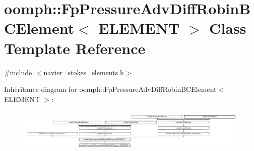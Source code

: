 \hypertarget{classoomph_1_1FpPressureAdvDiffRobinBCElement}{}\section{oomph\+:\+:Fp\+Pressure\+Adv\+Diff\+Robin\+B\+C\+Element$<$ E\+L\+E\+M\+E\+NT $>$ Class Template Reference}
\label{classoomph_1_1FpPressureAdvDiffRobinBCElement}


{\ttfamily \#include $<$navier\+\_\+stokes\+\_\+elements.\+h$>$}

Inheritance diagram for oomph\+:\+:Fp\+Pressure\+Adv\+Diff\+Robin\+B\+C\+Element$<$ E\+L\+E\+M\+E\+NT $>$\+:\begin{figure}[H]
\begin{center}
\leavevmode
\includegraphics[height=2.063882cm]{classoomph_1_1FpPressureAdvDiffRobinBCElement}
\end{center}
\end{figure}
